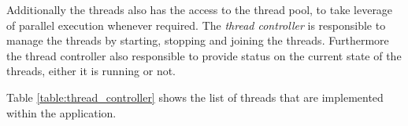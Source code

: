 Additionally the threads also has the access to the thread pool, to take leverage of parallel execution whenever required. The \textit{thread controller} is responsible to manage the threads by starting, stopping and joining the threads. Furthermore the thread controller also responsible to provide status on the current state of the threads, either it is running or not.

Table \ref{table:thread_controller} shows the list of threads that are implemented within the application.


